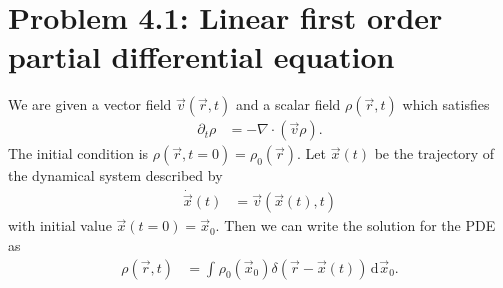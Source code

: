\documentclass[english, parskip=full]{scrartcl}
\title{\titel}
\author{\autor}
\date{\today}
\newcommand{\intx}{}
\newcommand{\intr}{}
\newcommand{\kla}{}
\newcommand{\klam}{}
\begin{document}
\maketitle  %


\section*{Problem 4.1: Linear first order partial differential equation}
We are given a vector field $\vec{v}(\vec{r},t)$ and a scalar field $\rho(\vec{r},t)$ which satisfies
\begin{align}
\partial_t\rho &= -\nabla\cdot \kla\left( \vec{v}\rho \right).
\end{align}
The initial condition is $\rho(\vec{r},t=0)=\rho_0(\vec{r})$.
Let $\vec{x}(t)$ be the trajectory of the dynamical system described by
\begin{align}
\dot{\vec{x}}(t) &= \vec{v}(\vec{x}(t), t)
\end{align}
with initial value $\vec{x}(t=0) = \vec{x}_0$.
Then we can write the solution for the PDE as
\begin{align}
\rho(\vec{r},t) &= \intr\int_{} \rho_0(\vec{x}_0)\delta\kla\left( \vec{r} - \vec{x}(t) \right) \, \mathrm{d}^{ }\vec{x}_0.
\end{align}
\end{document}
